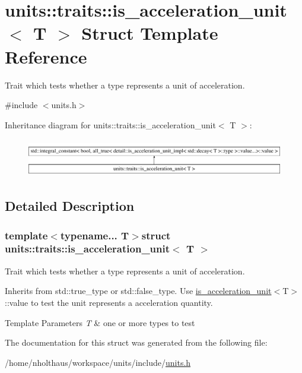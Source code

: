 \hypertarget{structunits_1_1traits_1_1is__acceleration__unit}{}\section{units\+:\+:traits\+:\+:is\+\_\+acceleration\+\_\+unit$<$ T $>$ Struct Template Reference}
\label{structunits_1_1traits_1_1is__acceleration__unit}


Trait which tests whether a type represents a unit of acceleration.  




{\ttfamily \#include $<$units.\+h$>$}

Inheritance diagram for units\+:\+:traits\+:\+:is\+\_\+acceleration\+\_\+unit$<$ T $>$\+:\begin{figure}[H]
\begin{center}
\leavevmode
\includegraphics[height=1.691843cm]{structunits_1_1traits_1_1is__acceleration__unit}
\end{center}
\end{figure}


\subsection{Detailed Description}
\subsubsection*{template$<$typename... T$>$struct units\+::traits\+::is\+\_\+acceleration\+\_\+unit$<$ T $>$}

Trait which tests whether a type represents a unit of acceleration. 

Inherits from {\ttfamily std\+::true\+\_\+type} or {\ttfamily std\+::false\+\_\+type}. Use {\ttfamily \hyperlink{structunits_1_1traits_1_1is__acceleration__unit}{is\+\_\+acceleration\+\_\+unit}$<$T$>$\+::value} to test the unit represents a acceleration quantity. 
\begin{DoxyTemplParams}{Template Parameters}
{\em T} & one or more types to test \\
\hline
\end{DoxyTemplParams}


The documentation for this struct was generated from the following file\+:\begin{DoxyCompactItemize}
\item 
/home/nholthaus/workspace/units/include/\hyperlink{units_8h}{units.\+h}\end{DoxyCompactItemize}
